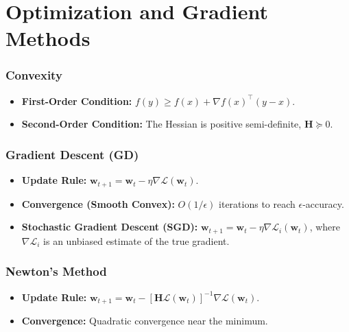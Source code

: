 \documentclass[11pt]{article}
\begin{document}
\hrulefill

\part{Optimization and Gradient Methods}

\section{Convexity}
\begin{itemize}
    \item \textbf{First-Order Condition:} \( f(y) \ge f(x) + \nabla f(x)^\top (y - x) \).
    \item \textbf{Second-Order Condition:} The Hessian is positive semi-definite, \( \mathbf{H} \succeq 0 \).
\end{itemize}

\section{Gradient Descent (GD)}
\begin{itemize}
    \item \textbf{Update Rule:} \( \mathbf{w}_{t+1} = \mathbf{w}_t - \eta \nabla \mathcal{L}(\mathbf{w}_t) \).
    \item \textbf{Convergence (Smooth Convex):} \( O(1/\epsilon) \) iterations to reach \(\epsilon\)-accuracy.
    \item \textbf{Stochastic Gradient Descent (SGD):} \( \mathbf{w}_{t+1} = \mathbf{w}_t - \eta \nabla \mathcal{L}_i(\mathbf{w}_t) \), where \(\nabla \mathcal{L}_i\) is an unbiased estimate of the true gradient.
\end{itemize}

\section{Newton's Method}
\begin{itemize}
    \item \textbf{Update Rule:} \( \mathbf{w}_{t+1} = \mathbf{w}_t - [\mathbf{H}\mathcal{L}(\mathbf{w}_t)]^{-1} \nabla \mathcal{L}(\mathbf{w}_t) \).
    \item \textbf{Convergence:} Quadratic convergence near the minimum.
\end{itemize}
\end{document}
